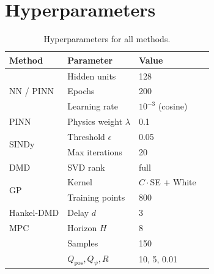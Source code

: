 \documentclass[conference]{IEEEtran}
\begin{document}
\appendix
\section{Hyperparameters}
\label{app:hyper}

\begin{table}[htbp]
\centering
\caption{Hyperparameters for all methods.}
\label{tab:hyper}
\begin{tabular}{llll}
\toprule
Method & Parameter & Value \\
\midrule
\multirow{3}{*}{NN / PINN} & Hidden units & 128 \\
  & Epochs & 200 \\
  & Learning rate & $10^{-3}$ (cosine) \\
\midrule
PINN & Physics weight $\lambda$ & 0.1 \\
\midrule
\multirow{2}{*}{SINDy} & Threshold $\epsilon$ & 0.05 \\
  & Max iterations & 20 \\
\midrule
DMD & SVD rank & full \\
\midrule
\multirow{2}{*}{GP} & Kernel & $C\cdot$SE + White \\
  & Training points & 800 \\
\midrule
Hankel-DMD & Delay $d$ & 3 \\
\midrule
MPC & Horizon $H$ & 8 \\
  & Samples & 150 \\
  & $Q_{\text{pos}}, Q_{\psi}, R$ & 10, 5, 0.01 \\
\bottomrule
\end{tabular}
\end{table}



\end{document}

